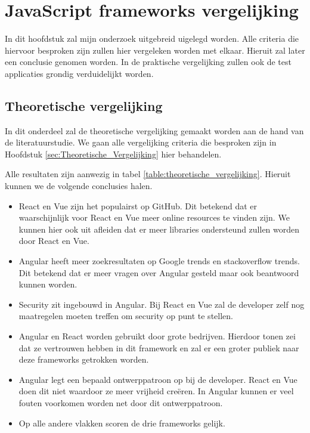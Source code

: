 
\chapter{JavaScript frameworks vergelijking}
\label{ch:onderzoek}

In dit hoofdstuk zal mijn onderzoek uitgebreid uigelegd worden. Alle criteria die hiervoor besproken zijn zullen hier vergeleken worden met elkaar. Hieruit zal later een conclusie genomen worden. In de praktische vergelijking zullen ook de test applicaties grondig verduidelijkt worden.

\section{Theoretische vergelijking}
\label{sec:theoretische_vergelijking}

In dit onderdeel zal de theoretische vergelijking gemaakt worden aan de hand van de literatuurstudie. We gaan alle vergelijking criteria die besproken zijn in Hoofdstuk \ref{sec:Theoretische_Vergelijking} hier behandelen.

Alle resultaten zijn aanwezig in tabel \ref{table:theoretische_vergelijking}. Hieruit kunnen we de volgende conclusies halen.

\begin{itemize}
	\item React en Vue zijn het populairst op GitHub. Dit betekend dat er waarschijnlijk voor React en Vue meer online resources te vinden zijn. We kunnen hier ook uit afleiden dat er meer libraries ondersteund zullen worden door React en Vue.
	\item Angular heeft meer zoekresultaten op Google trends en stackoverflow trends. Dit betekend dat er meer vragen over Angular gesteld maar ook beantwoord kunnen worden.
	\item Security zit ingebouwd in Angular. Bij React en Vue zal de developer zelf nog maatregelen moeten treffen om security op punt te stellen.
	\item Angular en React worden gebruikt door grote bedrijven. Hierdoor tonen zei dat ze vertrouwen hebben in dit framework en zal er een groter publiek naar deze frameworks getrokken worden.
	\item Angular legt een bepaald ontwerppatroon op bij de developer. React en Vue doen dit niet waardoor ze meer vrijheid creëren. In Angular kunnen er veel fouten voorkomen worden net door dit ontwerppatroon.
	\item Op alle andere vlakken scoren de drie frameworks gelijk.
\end{itemize}

